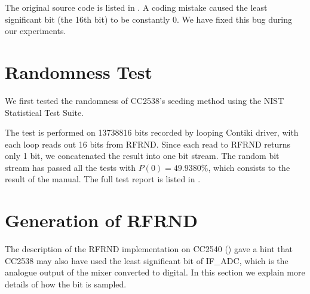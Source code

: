 The original source code is listed in . A coding mistake caused the least significant bit (the 16th bit) to be constantly 0. We have fixed this bug during our experiments.

\section{Randomness Test}
We first tested the randomness of CC2538's seeding method using the NIST Statistical Test Suite\cite{NistTestSuite}. 

The test is performed on 13738816 bits recorded by looping Contiki driver, with each loop reads out 16 bits from RFRND. Since each read to RFRND returns only 1 bit, we concatenated the result into one bit stream. The random bit stream has passed all the tests with $P(0) = 49.9380\%$, which consists to the result of the manual. The full test report is listed in .
%
%
%
%

\section{Generation of RFRND}

The description of the RFRND implementation on CC2540 () gave a hint that CC2538 may also have used the least significant bit of IF\_ADC, which is the analogue output of the mixer converted to digital. In this section we explain more details of how the bit is sampled.

